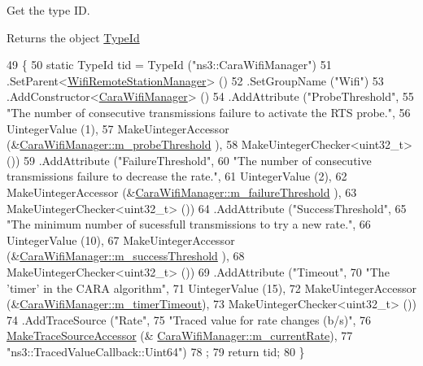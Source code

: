 Get the type ID. 

\begin{DoxyReturn}{Returns}
the object \hyperlink{classns3_1_1TypeId}{Type\+Id} 
\end{DoxyReturn}

\begin{DoxyCode}
49 \{
50   \textcolor{keyword}{static} TypeId tid = TypeId (\textcolor{stringliteral}{"ns3::CaraWifiManager"})
51     .SetParent<\hyperlink{classns3_1_1WifiRemoteStationManager_a78524840f5900e1937e8e2d6df48954d}{WifiRemoteStationManager}> ()
52     .SetGroupName (\textcolor{stringliteral}{"Wifi"})
53     .AddConstructor<\hyperlink{classns3_1_1CaraWifiManager_a3954b99f137c3755f5c284af101fb298}{CaraWifiManager}> ()
54     .AddAttribute (\textcolor{stringliteral}{"ProbeThreshold"},
55                    \textcolor{stringliteral}{"The number of consecutive transmissions failure to activate the RTS probe."},
56                    UintegerValue (1),
57                    MakeUintegerAccessor (&\hyperlink{classns3_1_1CaraWifiManager_ad08556bdda27678ebce6c1439a8f8845}{CaraWifiManager::m\_probeThreshold}
      ),
58                    MakeUintegerChecker<uint32\_t> ())
59     .AddAttribute (\textcolor{stringliteral}{"FailureThreshold"},
60                    \textcolor{stringliteral}{"The number of consecutive transmissions failure to decrease the rate."},
61                    UintegerValue (2),
62                    MakeUintegerAccessor (&\hyperlink{classns3_1_1CaraWifiManager_a4558af4c0968838cd480a98624af7a27}{CaraWifiManager::m\_failureThreshold}
      ),
63                    MakeUintegerChecker<uint32\_t> ())
64     .AddAttribute (\textcolor{stringliteral}{"SuccessThreshold"},
65                    \textcolor{stringliteral}{"The minimum number of sucessfull transmissions to try a new rate."},
66                    UintegerValue (10),
67                    MakeUintegerAccessor (&\hyperlink{classns3_1_1CaraWifiManager_a8ab462541b8e54a9d45849946fbce8c7}{CaraWifiManager::m\_successThreshold}
      ),
68                    MakeUintegerChecker<uint32\_t> ())
69     .AddAttribute (\textcolor{stringliteral}{"Timeout"},
70                    \textcolor{stringliteral}{"The 'timer' in the CARA algorithm"},
71                    UintegerValue (15),
72                    MakeUintegerAccessor (&\hyperlink{classns3_1_1CaraWifiManager_a68e0514247378508cad244e261e7fc3d}{CaraWifiManager::m\_timerTimeout}),
73                    MakeUintegerChecker<uint32\_t> ())
74     .AddTraceSource (\textcolor{stringliteral}{"Rate"},
75                      \textcolor{stringliteral}{"Traced value for rate changes (b/s)"},
76                      \hyperlink{group__tracing_gab21a770b9855af4e8f69f7531ea4a6b0}{MakeTraceSourceAccessor} (&
      \hyperlink{classns3_1_1CaraWifiManager_abe69c294ab9d5993c1b5d3e8ae90c91a}{CaraWifiManager::m\_currentRate}),
77                      \textcolor{stringliteral}{"ns3::TracedValueCallback::Uint64"})
78   ;
79   \textcolor{keywordflow}{return} tid;
80 \}
\end{DoxyCode}


